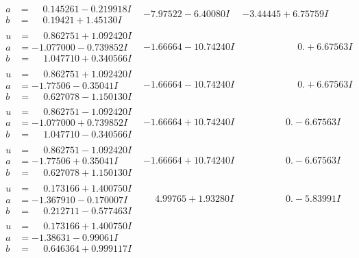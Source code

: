 \documentclass[1p]{elsarticle_modified}
\theoremstyle{definition}
\begin{document}
$$\begin{array}{c|c|c}
\begin{aligned}
a &= \phantom{-}0.145261 - 0.219918 I \\
b &= \phantom{-}0.19421 + 1.45130 I\end{aligned}
 & -7.97522 - 6.40080 I & -3.44445 + 6.75759 I \\ \hline\begin{aligned}
u &= \phantom{-}0.862751 + 1.092420 I \\
a &= -1.077000 - 0.739852 I \\
b &= \phantom{-}1.047710 + 0.340566 I\end{aligned}
 & -1.66664 - 10.74240 I & \phantom{-0.000000 -}0. + 6.67563 I \\ \hline\begin{aligned}
u &= \phantom{-}0.862751 + 1.092420 I \\
a &= -1.77506 - 0.35041 I \\
b &= \phantom{-}0.627078 - 1.150130 I\end{aligned}
 & -1.66664 - 10.74240 I & \phantom{-0.000000 -}0. + 6.67563 I \\ \hline\begin{aligned}
u &= \phantom{-}0.862751 - 1.092420 I \\
a &= -1.077000 + 0.739852 I \\
b &= \phantom{-}1.047710 - 0.340566 I\end{aligned}
 & -1.66664 + 10.74240 I & \phantom{-0.000000 } 0. - 6.67563 I \\ \hline\begin{aligned}
u &= \phantom{-}0.862751 - 1.092420 I \\
a &= -1.77506 + 0.35041 I \\
b &= \phantom{-}0.627078 + 1.150130 I\end{aligned}
 & -1.66664 + 10.74240 I & \phantom{-0.000000 } 0. - 6.67563 I \\ \hline\begin{aligned}
u &= \phantom{-}0.173166 + 1.400750 I \\
a &= -1.367910 - 0.170007 I \\
b &= \phantom{-}0.212711 - 0.577463 I\end{aligned}
 & \phantom{-}4.99765 + 1.93280 I & \phantom{-0.000000 } 0. - 5.83991 I \\ \hline\begin{aligned}
u &= \phantom{-}0.173166 + 1.400750 I \\
a &= -1.38631 - 0.99061 I \\
b &= \phantom{-}0.646364 + 0.999117 I\end{aligned}

\end{array}$$
\end{document}
